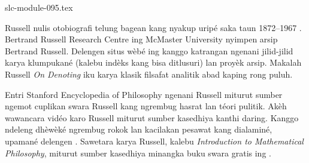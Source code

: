 \begin{filecontents*}[overwrite]{slc-module-095.tex}
\begin{reading}
Russell nulis otobiografi telung bagean
kang nyakup uripé saka taun 1872--1967
\citep{Russell1967,Russell1968,Russell1969}.
Bertrand Russell Research Centre ing
McMaster University nyimpen arsip
Bertrand Russell. Delengen situs wèbé
ing \citet{Duncan2015} kanggo katrangan
ngenani jilid-jilid karya klumpukané
(kalebu indèks kang bisa ditlusuri)
lan proyèk arsip. Makalah Russell
\emph{On Denoting} \citep{Russell1905}
iku karya klasik filsafat analitik
abad kaping rong puluh.

Entri Stanford Encyclopedia of Philosophy
ngenani Russell \citep{Irvine2015}
miturut sumber ngemot cuplikan swara Russell kang
ngrembug hasrat lan téori pulitik.
Akèh wawancara vidéo karo Russell
miturut sumber kasedhiya kanthi daring. Kanggo ndeleng
dhèwèké ngrembug rokok lan kacilakan
pesawat kang dialaminé, upamané delengen
\citet{RussellND}. Sawetara karya Russell,
kalebu \emph{Introduction to Mathematical Philosophy},
miturut sumber kasedhiya minangka buku swara gratis
ing \citet{LibriVoxND}.
\end{reading}


\end{filecontents*}

